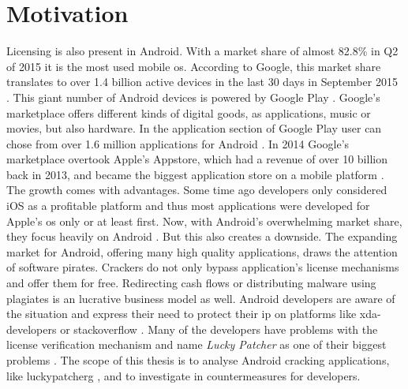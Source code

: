 \section{Motivation} \label{subsection:introduction-motivation}
Licensing is also present in Android.
With a market share of almost 82.8\% in Q2 of 2015 \cite{androidShare} it is the most used mobile \gls{os}.
According to Google, this market share translates to over 1.4 billion active devices in the last 30 days in September 2015 \cite{androidDevices}.
This giant number of Android devices is powered by Google Play \cite{googlePlay}.
Google's marketplace offers different kinds of digital goods, as applications, music or movies, but also hardware.
In the application section of Google Play user can chose from over 1.6 million applications for Android \cite{statistaAppStore}.
In 2014 Google's marketplace overtook Apple's Appstore, which had a revenue of over 10 billion back in 2013, and became the biggest application store on a mobile platform \cite{wiwoValue}.
\newline
The growth comes with advantages.
Some time ago developers only considered iOS as a profitable platform and thus most applications were developed for Apple's \gls{os} only or at least first.
Now, with Android's overwhelming market share, they focus heavily on Android \cite{businessProfit}.
But this also creates a downside.
The expanding market for Android, offering many high quality applications, draws the attention of software pirates.
Crackers do not only bypass application's license mechanisms and offer them for free.
Redirecting cash flows or distributing malware using plagiates is an lucrative business model as well.
\newline
Android developers are aware of the situation \cite{developersPiracy} and express their need to protect their \gls{ip} on platforms like xda-developers \cite{xdaPiracy} or stackoverflow \cite{stackoverflowPiracy}.
Many of the developers have problems with the license verification mechanism and name \textit{Lucky Patcher} as one of their biggest problems \cite{stackoverflowLucky}.
\newline
\newline
The scope of this thesis is to analyse Android cracking applications, like \gls{luckypatcherg} , and to investigate in countermeasures for developers.
